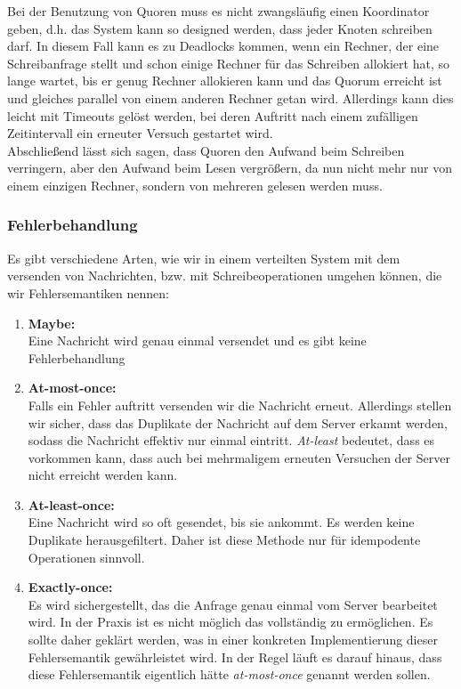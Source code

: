 Bei der Benutzung von Quoren muss es nicht zwangsläufig einen Koordinator geben, d.h. das System kann so designed werden, dass jeder Knoten schreiben darf. In diesem Fall kann es zu Deadlocks kommen, wenn ein Rechner, der eine Schreibanfrage stellt und schon einige Rechner für das Schreiben allokiert hat, so lange wartet, bis er genug Rechner allokieren kann und das Quorum erreicht ist und gleiches parallel von einem anderen Rechner getan wird. Allerdings kann dies leicht mit Timeouts gelöst werden, bei deren Auftritt nach einem zufälligen Zeitintervall ein erneuter Versuch gestartet wird.\\

Abschließend lässt sich sagen, dass Quoren den Aufwand beim Schreiben verringern, aber den Aufwand beim Lesen vergrößern, da nun nicht mehr nur von einem einzigen Rechner, sondern von mehreren gelesen werden muss.

\subsubsection{Fehlerbehandlung}

Es gibt verschiedene Arten, wie wir in einem verteilten System mit dem versenden von Nachrichten, bzw. mit Schreibeoperationen umgehen können, die wir Fehlersemantiken nennen:

\begin{enumerate}
      \item \textbf{Maybe:}\\
            Eine Nachricht wird genau einmal versendet und es gibt keine Fehlerbehandlung
      \item \textbf{At-most-once:}\\
            Falls ein Fehler auftritt versenden wir die Nachricht erneut. Allerdings stellen wir sicher, dass das Duplikate der Nachricht auf dem Server erkannt werden, sodass die Nachricht effektiv nur einmal eintritt. \textit{At-least} bedeutet, dass es vorkommen kann, dass auch bei mehrmaligem erneuten Versuchen der Server nicht erreicht werden kann.
      \item \textbf{At-least-once:}\\
            Eine Nachricht wird so oft gesendet, bis sie ankommt. Es werden keine Duplikate herausgefiltert. Daher ist diese Methode nur für idempodente Operationen sinnvoll.
      \item \textbf{Exactly-once:}\\
            Es wird sichergestellt, das die Anfrage genau einmal vom Server bearbeitet wird. In der Praxis ist es nicht möglich das vollständig zu ermöglichen. Es sollte daher geklärt werden, was in einer konkreten Implementierung dieser Fehlersemantik gewährleistet wird. In der Regel läuft es darauf hinaus, dass diese Fehlersemantik eigentlich hätte \textit{at-most-once} genannt werden sollen.
\end{enumerate}

